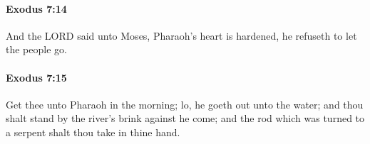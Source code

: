 		\paragraph{Exodus 7:14} %
			\label{EXODUS-7-14}

			And the LORD said unto Moses, Pharaoh's heart is hardened, he refuseth to let the people go.


		\paragraph{Exodus 7:15} %
			\label{EXODUS-7-15}

			Get thee unto Pharaoh in the morning; lo, he goeth out unto the water; and thou shalt stand by the river's brink against he come; and the rod which was turned to a serpent shalt thou take in thine hand.


